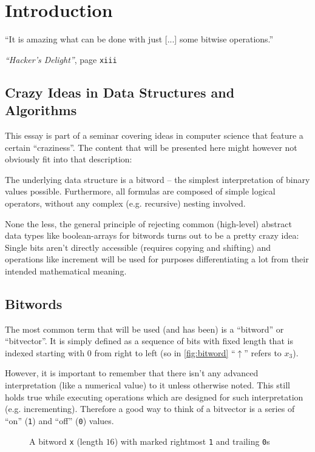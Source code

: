 \section{Introduction}\label{sec:introduction}
\epigraph{
``It is amazing what can be done
with just [...] some bitwise operations.''
}{
\emph{``Hacker's Delight''}, page \texttt{xiii}
\cite{Warren:2012:HD:2462741}
}


\subsection*{Crazy Ideas in Data Structures and Algorithms}
This essay is part of a seminar covering
ideas in computer science that feature a certain ``craziness''.
The content that will be presented here
might however not obviously fit into that description:

The underlying data structure is a bitword
-- the simplest interpretation of binary values possible.
Furthermore, all formulas are composed of simple logical operators,
without any complex (e.g. recursive) nesting involved.

None the less, the general principle of rejecting
common (high-level) abstract data types like boolean-arrays
for bitwords turns out to be a pretty crazy idea:
Single bits aren't directly accessible (requires copying and shifting)
and operations like increment will be used for
purposes differentiating a lot from their intended mathematical meaning.


\subsection*{Bitwords}
The most common term that will be used (and has been)
is a ``bitword'' or ``bitvector''.
It is simply defined as a sequence of bits with fixed length
that is indexed starting with $0$ from right to left
(so in \autoref{fig:bitword} ``$\uparrow$'' refers to $x_3$).

However, it is important to remember that
there isn't any advanced interpretation (like a numerical value) to it
unless otherwise noted.
This still holds true while executing operations
which are designed for such interpretation (e.g. incrementing).
Therefore a good way to think of a bitvector
is a series of ``on'' (\lstinline$1$) and ``off'' (\lstinline$0$) values.

\begin{figure}[h]
\begin{comment}
\[
x = \verb$1100 1011 001 $
\underset{\uparrow}{\verb$1$}
\underbrace{\verb$000$}
\]
\end{comment}
\caption{
A bitword \lstinline$x$ (length $16$)
with marked rightmost \lstinline$1$ and trailing \lstinline$0$s
}
\label{fig:bitword}
\end{figure}

